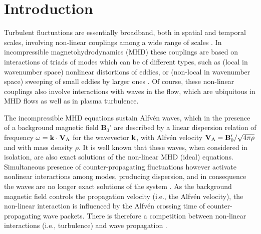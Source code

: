 \documentclass[aip,pop,reprint,amsmath,amssymb,floatfix]{revtex4-1}
\renewcommand{\vec}[1]{\mathbf{#1}}
\begin{document}
\maketitle

\section{Introduction}\label{sec_Intro}

Turbulent fluctuations are essentially broadband, both in spatial and
temporal scales, involving non-linear couplings among a wide range of
scales \cite{frisch_turbulence_1995}. In incompressible
magnetohydrodynamics (MHD) \cite{pouquet_strong_1976,
  zhou_magnetohydrodynamic_2004} these couplings are based on
interactions of triads of modes \cite{zhou_non-gaussian_1993, 
  alexakis_turbulent_2007, teaca_energy_2009, aluie_2010, 
  mininni_scale_2011} which can be of different types, such as (local 
in wavenumber space) nonlinear distortions of eddies, or (non-local 
in wavenumber space) sweeping of small eddies by larger ones
\cite{kraichnan_structure_1959,
  tennekes_eulerian_1975, chen_sweeping_1989, nelkin_time_1990,
  matthaeus_eulerian_2010, servidio_time_2011,
  carbone_anisotropy_2011}. Of course, these non-linear couplings also
involve interactions with waves in the flow, which are ubiquitous in
MHD flows as well as in plasma turbulence.

The incompressible MHD equations sustain Alfv\'en waves, which in the
presence of a background magnetic field $\vec{B}_0'$ are described by
a linear dispersion relation of frequency
$\omega={\bf k} \cdot {\bf V}_\textrm{A}$ for the wavevector
${\bf k}$, with Alfv\'en velocity
${\bf V}_\textrm{A}={\bf B}_0'/\sqrt{4\pi \rho}$ and with mass density
$\rho$. It is well known that these waves, when considered in
isolation, are also exact solutions of the non-linear MHD (ideal)
equations. Simultaneous presence of counter-propagating fluctuations
however activate nonlinear interactions among modes, producing
dispersion, and in consequence the waves are no longer exact solutions
of the system \cite{dobrowolny_1980_HydromagneticTurbulence}. As the
background magnetic field controls the propagation velocity (i.e., the
Alfv\'en velocity), the non-linear interaction is influenced by the
Alfv\'en crossing time of counter-propagating wave packets. There is
therefore a competition between non-linear interactions (i.e.,
turbulence) and wave propagation \cite{dmitruk_waves_2009}.
\end{document}
